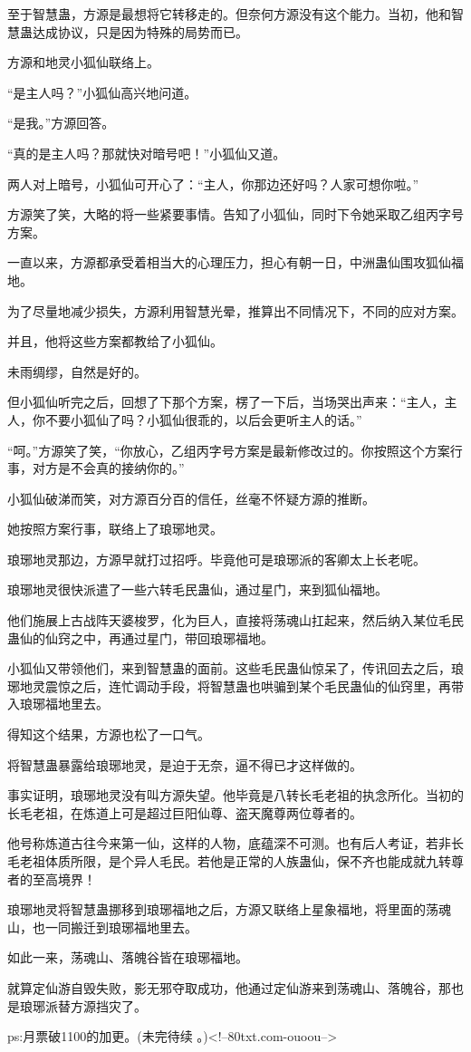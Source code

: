 \begin{this_body}
至于智慧蛊，方源是最想将它转移走的。但奈何方源没有这个能力。当初，他和智慧蛊达成协议，只是因为特殊的局势而已。

方源和地灵小狐仙联络上。

“是主人吗？”小狐仙高兴地问道。

“是我。”方源回答。

“真的是主人吗？那就快对暗号吧！”小狐仙又道。

两人对上暗号，小狐仙可开心了：“主人，你那边还好吗？人家可想你啦。”

方源笑了笑，大略的将一些紧要事情。告知了小狐仙，同时下令她采取乙组丙字号方案。

一直以来，方源都承受着相当大的心理压力，担心有朝一日，中洲蛊仙围攻狐仙福地。

为了尽量地减少损失，方源利用智慧光晕，推算出不同情况下，不同的应对方案。

并且，他将这些方案都教给了小狐仙。

未雨绸缪，自然是好的。

但小狐仙听完之后，回想了下那个方案，楞了一下后，当场哭出声来：“主人，主人，你不要小狐仙了吗？小狐仙很乖的，以后会更听主人的话。”

“呵。”方源笑了笑，“你放心，乙组丙字号方案是最新修改过的。你按照这个方案行事，对方是不会真的接纳你的。”

小狐仙破涕而笑，对方源百分百的信任，丝毫不怀疑方源的推断。

她按照方案行事，联络上了琅琊地灵。

琅琊地灵那边，方源早就打过招呼。毕竟他可是琅琊派的客卿太上长老呢。

琅琊地灵很快派遣了一些六转毛民蛊仙，通过星门，来到狐仙福地。

他们施展上古战阵天婆梭罗，化为巨人，直接将荡魂山扛起来，然后纳入某位毛民蛊仙的仙窍之中，再通过星门，带回琅琊福地。

小狐仙又带领他们，来到智慧蛊的面前。这些毛民蛊仙惊呆了，传讯回去之后，琅琊地灵震惊之后，连忙调动手段，将智慧蛊也哄骗到某个毛民蛊仙的仙窍里，再带入琅琊福地里去。

得知这个结果，方源也松了一口气。

将智慧蛊暴露给琅琊地灵，是迫于无奈，逼不得已才这样做的。

事实证明，琅琊地灵没有叫方源失望。他毕竟是八转长毛老祖的执念所化。当初的长毛老祖，在炼道上可是超过巨阳仙尊、盗天魔尊两位尊者的。

他号称炼道古往今来第一仙，这样的人物，底蕴深不可测。也有后人考证，若非长毛老祖体质所限，是个异人毛民。若他是正常的人族蛊仙，保不齐也能成就九转尊者的至高境界！

琅琊地灵将智慧蛊挪移到琅琊福地之后，方源又联络上星象福地，将里面的荡魂山，也一同搬迁到琅琊福地里去。

如此一来，荡魂山、落魄谷皆在琅琊福地。

就算定仙游自毁失败，影无邪夺取成功，他通过定仙游来到荡魂山、落魄谷，那也是琅琊派替方源挡灾了。

ps:月票破1100的加更。(未完待续 。)<!--80txt.com-ouoou-->

\end{this_body}

